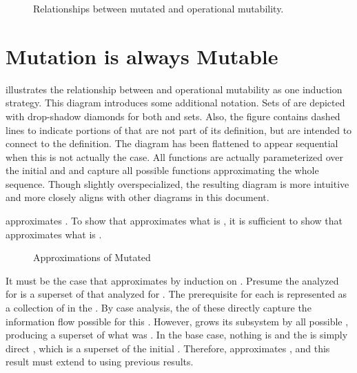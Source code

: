 \pagebreak[4]
\begin{figure}
  \centering
  \FIGmutableExecute{}
  \caption{Relationships between mutated and operational mutability. \label{fig:flow:mutatedMutable}}
\end{figure}

\section{Mutation is always Mutable}


 illustrates the relationship between \TMmutated{} and operational mutability as one induction strategy.
This diagram introduces some additional notation.
Sets of \TMrefs{} are depicted with drop-shadow diamonds for both \TMmutated{} and \TMmutable{} sets.
Also, the figure contains dashed lines to indicate portions of \TMmutableExecute{} that are not part of its definition, but are intended to connect to the definition.
The diagram has been flattened to appear sequential when this is not actually the case.
All functions are actually parameterized over the initial \TMsystemState{} and \TMdirAccAG{} and capture all possible functions approximating the whole \TMop{} sequence.
Though slightly overspecialized, the resulting diagram is more intuitive and more closely aligns with other diagrams in this document.

\xmakefirstuc{\TMmutablePotAccExecute} approximates \TMmutableDirAccExecute{}.
To show that \TMmutablePotAccExecute{} approximates what is \TMmutated{}, it is sufficient to show that \TMmutableDirAccExecute{} approximates what is \TMmutated{}.

\begin{figure}
\COQDOCmutableDirAccExecuteMutatedApprox{} 
\COQDOCmutatedApproxMutablePotAccExecute{} 
\caption{Approximations of Mutated \label{fig:flow:mutatedapprox}}
\end{figure}

It must be the case that \TMmutableDirAccExecute{} approximates \TMmutated{} by induction on \TMops{}.
Presume the \TMsubsystem{} analyzed for \TMmutableDirAccExecute{} is a superset of that analyzed for \TMmutation{}.
The prerequisite \TMcap{} for each \TMop{} is represented as a collection of \TMaccessEdges{} in the \TMdirAccAG{}.
By case analysis, the \TMmutability{} of these \TMaccessEdges{} directly capture the information flow possible for this \TMop{}.
However, \TMmutableDirAccExecute{} grows its subsystem by all possible \TMmutations{}, producing a superset of what was \TMmutated{}.
In the base case, nothing is \TMmutated{} and the \TMmutableDirAccExecute{} is simply direct \TMmutability{}, which is a superset of the initial \TMsubsystem{}.
Therefore, \TMmutableDirAccExecute{} approximates \TMmutated{}, and this result must extend to \TMmutablePotAccExecute{} using previous results.

